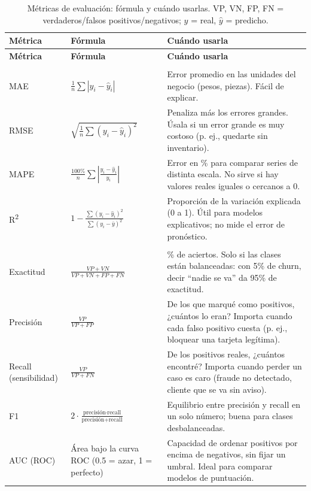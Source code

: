 \begingroup
\footnotesize
\setlength{\tabcolsep}{4pt}
\renewcommand{\arraystretch}{1.35}
\begin{longtable}{@{}>{\raggedright\arraybackslash}p{2.3cm}
                    >{\raggedright\arraybackslash}p{5.4cm}
                    >{\raggedright\arraybackslash}p{8.1cm}@{}}
\caption{Métricas de evaluación: fórmula y cuándo usarlas. VP, VN, FP, FN = verdaderos/falsos positivos/negativos; $y$ = real, $\hat y$ = predicho.}
\label{tab:ap-b-metricas}\\
\toprule
\textbf{Métrica} & \textbf{Fórmula} & \textbf{Cuándo usarla} \\
\midrule
\endfirsthead
\toprule
\textbf{Métrica} & \textbf{Fórmula} & \textbf{Cuándo usarla} \\
\midrule
\endhead
\bottomrule
\endlastfoot
\multicolumn{3}{@{}l}{\textbf{\color{secundario}Regresión y pronóstico}} \\
MAE & $\frac{1}{n}\sum |y_i - \hat y_i|$ & Error promedio en las unidades del negocio (pesos, piezas). Fácil de explicar. \\
RMSE & $\sqrt{\frac{1}{n}\sum (y_i - \hat y_i)^2}$ & Penaliza más los errores grandes. Úsala si un error grande es muy costoso (p. ej., quedarte sin inventario). \\
MAPE & $\frac{100\%}{n}\sum \left|\frac{y_i - \hat y_i}{y_i}\right|$ & Error en \% para comparar series de distinta escala. No sirve si hay valores reales iguales o cercanos a 0. \\
R\textsuperscript{2} & $1 - \frac{\sum (y_i - \hat y_i)^2}{\sum (y_i - \bar y)^2}$ & Proporción de la variación explicada (0 a 1). Útil para modelos explicativos; no mide el error de pronóstico. \\
\midrule
\multicolumn{3}{@{}l}{\textbf{\color{secundario}Clasificación}} \\
Exactitud & $\frac{VP + VN}{VP + VN + FP + FN}$ & \% de aciertos. Solo si las clases están balanceadas: con 5\% de churn, decir ``nadie se va'' da 95\% de exactitud. \\
Precisión & $\frac{VP}{VP + FP}$ & De los que marqué como positivos, ¿cuántos lo eran? Importa cuando cada falso positivo cuesta (p. ej., bloquear una tarjeta legítima). \\
Recall (sensibilidad) & $\frac{VP}{VP + FN}$ & De los positivos reales, ¿cuántos encontré? Importa cuando perder un caso es caro (fraude no detectado, cliente que se va sin aviso). \\
F1 & $2 \cdot \frac{\text{precisión} \cdot \text{recall}}{\text{precisión} + \text{recall}}$ & Equilibrio entre precisión y recall en un solo número; buena para clases desbalanceadas. \\
AUC (ROC) & Área bajo la curva ROC (0.5 = azar, 1 = perfecto) & Capacidad de ordenar positivos por encima de negativos, sin fijar un umbral. Ideal para comparar modelos de puntuación. \\
\end{longtable}
\endgroup

